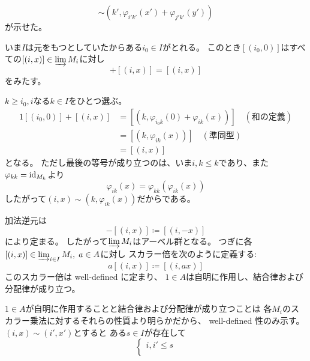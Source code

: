 \documentclass[report]{jlreq}
\begin{document}
\begin{answer}
\begin{innerproof}
\begin{equation}
                \sim (k', \varphi_{i'k'}(x') + \varphi_{j'k'}(y'))
        \end{equation}
        が示せた。
    \end{innerproof}
    いま$I$は元をもつとしていたからある$i_0 \in I$がとれる。
    このとき$[(i_0, 0)]$はすべての$[(i, x)] \in \varinjlim M_i$に対し
    \begin{equation}
        [(i_0, 0)] + [(i, x)] = [(i, x)]
    \end{equation}
    をみたす。
    \begin{innerproof}
        $k \ge i_0, i$なる$k \in I$をひとつ選ぶ。
        \begin{alignat}{1}
            [(i_0, 0)] + [(i, x)]
                &= [(k, \varphi_{i_0k}(0) + \varphi_{ik}(x))]
                    \quad (\text{和の定義}) \\
                &= [(k, \varphi_{ik}(x))]
                    \quad (\text{準同型}) \\
                &= [(i, x)]
        \end{alignat}
        となる。
        ただし最後の等号が成り立つのは、いま$i, k \le k$であり、また
        $\varphi_{kk} = \mathrm{id}_{M_k}$より
        \begin{equation}
            \varphi_{ik}(x) = \varphi_{kk} (\varphi_{ik}(x))
        \end{equation}
        したがって$(i, x) \sim (k, \varphi_{ik}(x)) $だからである。
    \end{innerproof}
    加法逆元は
    \begin{equation}
        - [(i, x)] \coloneqq [(i, -x)]
    \end{equation}
    により定まる。
    したがって$\varinjlim M_i$はアーベル群となる。
    つぎに各$[(i, x)] \in \varinjlim_{i \in I} M_i, \; a \in A$に対し
    スカラー倍を次のように定義する:
    \begin{equation}
        a [(i, x)] \coloneqq [(i, ax)]
    \end{equation}
    このスカラー倍は well-defined に定まり、
    $1 \in A$は自明に作用し、結合律および分配律が成り立つ。
    \begin{innerproof}
        $1 \in A$が自明に作用することと結合律および分配律が成り立つことは
        各$M_i$のスカラー乗法に対するそれらの性質より明らかだから、
        well-defined 性のみ示す。
        $(i, x) \sim (i', x')$とすると
        ある$s \in I$が存在して
        \begin{equation}
            \begin{cases}
                i, i' \le s \\

\end{cases}
\end{equation}
\end{innerproof}
\end{answer}
\end{document}
